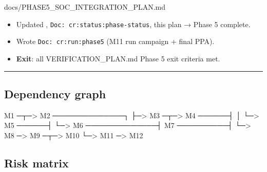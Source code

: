 \begin{relocated}{docs/PHASE5_SOC_INTEGRATION_PLAN.md}
\begin{itemize}
\tightlist
\item
  \ok{} Updated ,
  \texttt{Doc:\allowbreak{}\ cr:\allowbreak{}status:\allowbreak{}phase-\allowbreak{}status},
  this plan → Phase 5 complete.
\item
  \ok{} Wrote
  \texttt{Doc:\allowbreak{}\ cr:\allowbreak{}run:\allowbreak{}phase5}
  (M11 run campaign + final PPA).
\item
  \textbf{Exit}: all VERIFICATION\_\allowbreak{}PLAN.md Phase 5 exit
  criteria met.
\end{itemize}

\begin{center}\rule{0.5\linewidth}{0.5pt}\end{center}

\subsection{Dependency graph}\label{ds:ch:phase5-soc-integration-plan:4-dependency-graph}

\begin{textblock}
M1 ─┬─> M2 ──────────────┐
    ├─> M3 ─┬─> M4 ──────┤
    │       └─> M5 ──────┤
    └─> M6 ──────────────┤
            M7 ──────────┤
                         └─> M8 ─> M9 ─┬─> M10
                                       └─> M11 ─> M12
\end{textblock}

\subsection{Risk matrix}\label{ds:ch:phase5-soc-integration-plan:5-risk-matrix}

{\small\setlength{\tabcolsep}{4pt}

}
\end{relocated}
